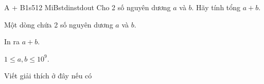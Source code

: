 \begin{problem}{A + B}{1s}{512 MiB}{stdin}{stdout}
Cho 2 số nguyên dương $a$ và $b$. Hãy tính tổng $a + b$.

\InputFile
Một dòng chứa 2 số nguyên dương $a$ và $b$.

\OutputFile
In ra $a + b$.

\Constraints
$1 \le a, b \le 10^9$.

\Example
\begin{example}
%
%
\end{example}

\begin{examplewide}
%
\end{examplewide}

\begin{examplewide}
%
\end{examplewide}

\begin{examplethree}
%
%
\end{examplethree}

\Explanations

Viết giải thích ở đây nếu có
\end{problem}